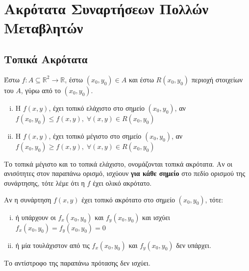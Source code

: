 \documentclass[a4paper,table]{report}
\begin{document}
\chapter*{Ακρότατα Συναρτήσεων Πολλών Μεταβλητών}

\section{Τοπικά Ακρότατα}

\begin{mybox1}
\begin{dfn}
\item {}
  Έστω $ f \colon A \subseteq \mathbb{R}^{2} \to \mathbb{R} $, έστω 
  $ (x_{0}, y_{0}) \in A $ και έστω $R(x_{0}, y_{0}) $ περιοχή στοιχείων του $A$, 
  γύρω από το $ (x_{0}, y_{0}) $.
  \begin{enumerate}[i)]
    \item 
      Η $ f(x,y) $, έχει τοπικό ελάχιστο στο σημείο $ (x_{0}, y_{0}) $, αν 
      $ f(x_{0}, y_{0}) \leq f(x,y), \; \forall (x,y) \in R(x_{0}, y_{0}) $ 
    \item 
      Η $ f(x,y) $, έχει τοπικό μέγιστο στο σημείο $ (x_{0}, y_{0}) $, αν 
      $ f(x_{0}, y_{0}) \geq f(x,y), \; \forall (x,y) \in R(x_{0}, y_{0}) $ 
  \end{enumerate}
  Το τοπικά μέγιστο και το τοπικά ελάχιστο, ονομάζονται \textcolor{Col1}{τοπικά
  ακρότατα}. 
  Αν οι ανισότητες στον παραπάνω ορισμό, ισχύουν \textbf{για κάθε σημείο} στο πεδίο 
  ορισμού της συνάρτησης, τότε λέμε ότι η $f$ έχει \textcolor{Col1}{ολικό ακρότατο}.
\end{dfn}
\end{mybox1}

\begin{prop}\label{prop:fermat2}
\item {}
  Αν η συνάρτηση $ f(x,y) $ έχει τοπικό ακρότατο στο σημείο $ (x_{0}, y_{0}) $, 
  τότε:
  \begin{enumerate}[i)]
    \item ή υπάρχουν οι $ f_{x}(x_{0}, y_{0}) $ και $ f_{y}(x_{0}, y_{0}) $ 
      και ισχύει $ f_{x}(x_{0}, y_{0}) = f_{y}(x_{0}, y_{0} )=0 $
    \item ή μία τουλάχιστον από τις $ f_{x}(x_{0}, y_{0}) $ και 
      $ f_{y}(x_{0}, y_{0}) $ δεν υπάρχει.
  \end{enumerate}
\end{prop}

\begin{rem}
\item {}
  Το αντίστροφο της παραπάνω πρότασης δεν ισχύει. 
\end{rem}
\end{document}
